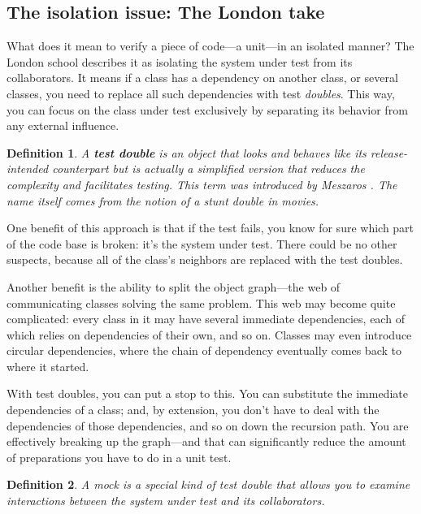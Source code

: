 \documentclass{article}
\newtheorem{definition}{Definition}
\begin{document}
\subsection{ The isolation issue: The London take}

What does it mean to verify a piece of code—a unit—in an isolated manner? The London school describes it as isolating the system under test from its collaborators. It means if a class has a dependency on another class, or several classes, you need to replace all such dependencies with test \textit{doubles}. This way, you can focus on the class under test exclusively by separating its behavior from any external influence.

\begin{definition}
A \textbf{test double} is an object that looks and behaves like its release-intended counterpart but is actually a simplified version that reduces the complexity and facilitates testing. This term was introduced by Meszaros \cite{Meszaros07}. The name itself comes from the notion of a stunt double in movies.
\end{definition}

One benefit of this approach is that if the test fails, you know for sure which part of the code base is broken: it’s the system under test. There could be no other suspects, because all of the class’s neighbors are replaced with the test doubles.

Another benefit is the ability to split the object graph—the web of communicating classes solving the same problem. This web may become quite complicated: every class in it may have several immediate dependencies, each of which relies on dependencies of their own, and so on. Classes may even introduce circular dependencies, where the chain of dependency eventually comes back to where it started.

With test doubles, you can put a stop to this. You can substitute the immediate dependencies of a class; and, by extension, you don’t have to deal with the dependencies of those dependencies, and so on down the recursion path. You are effectively breaking up the graph—and that can significantly reduce the amount of preparations you have to do in a unit test.

\begin{definition}
A mock is a special kind of test double that allows you to examine interactions between the system under test and its collaborators.
\end{definition}
\end{document}
